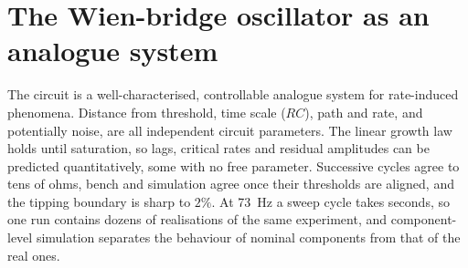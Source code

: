 \section{The Wien-bridge oscillator as an analogue system}\label{sec:analogue}

The circuit is a well-characterised, controllable analogue system for rate-induced phenomena. Distance
from threshold, time scale ($RC$), path and rate, and potentially noise, are all independent circuit
parameters. The linear growth law holds until saturation, so lags, critical rates and residual amplitudes
can be predicted quantitatively, some with no free parameter. Successive cycles agree to tens of ohms,
bench and simulation agree once their thresholds are aligned, and the tipping boundary is sharp to $2\%$.
At \SI{73}{\hertz} a sweep cycle takes seconds, so one run contains dozens of realisations of the same
experiment, and component-level simulation separates the behaviour of nominal components from that of
the real ones.
